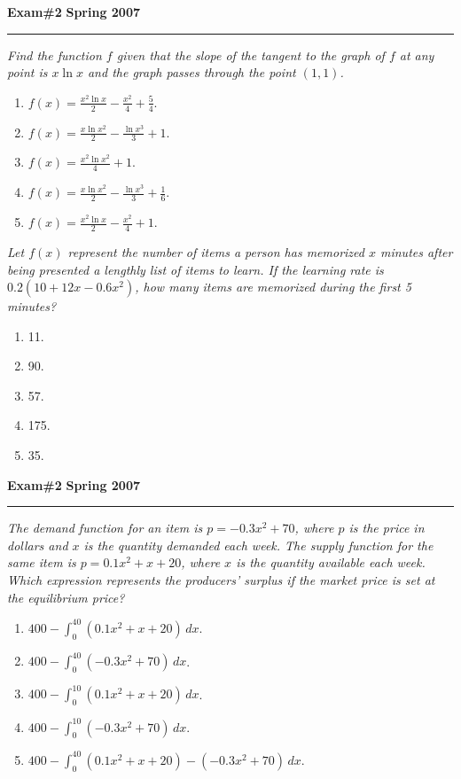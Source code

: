 \documentclass[12pt]{article}
\begin{document}
\hfill{\large\bf Exam\#2}\hfill{\large\bf
  Spring 2007}\hrule
\bigskip

{\problem \em Find the function $f$ given that the slope of the
  tangent to the graph of $f$ at any point is $x\ln x$ and the graph
  passes through the point $(1,1)$.}
\begin{enumerate}
\item $\displaystyle{f(x) = \frac{x^2\ln x}{2} - \frac{x^2}{4} +
    \frac{5}{4}}$.
\item $\displaystyle{f(x) = \frac{x\ln x^2}{2} - \frac{\ln x^3}{3} +
    1}$.
\item $\displaystyle{f(x) = \frac{x^2\ln x^2}{4} + 1}$.
\item $\displaystyle{f(x) = \frac{x\ln x^2}{2} - \frac{\ln x^3}{3} +
    \frac{1}{6}}$.
\item $\displaystyle{f(x) = \frac{x^2\ln x}{2} - \frac{x^2}{4} + 1}$.
\end{enumerate}
\vspace{4cm}

{\problem \em Let $f(x)$ represent the number of items a person has
  memorized $x$ minutes after being presented a lengthly list of
  items to learn.  If the learning rate is $0.2 (10 + 12x - 0.6x^2)$,
  how many items are memorized during the first 5 minutes?}
\begin{enumerate}
\item 11.
\item 90.
\item 57.
\item 175.
\item 35.
\end{enumerate}
\newpage

\hfill{\large\bf Exam\#2}\hfill{\large\bf
  Spring 2007}\hrule
\bigskip

{\problem \em The demand function for an item is $p = -0.3x^2+70$,
  where $p$ is the price in dollars and $x$ is the quantity demanded
  each week.  The supply function for the same item is $p =0.1 x^2
  +x+20$, where $x$ is the quantity available each week.  Which
  expression represents the producers' surplus if the market price is
  set at the equilibrium price?}
\begin{enumerate}
\item $\displaystyle{400 - \int_0^{40} (0.1x^2+x+20)\, dx}$.
\item $\displaystyle{400 - \int_0^{40} (-0.3x^2+70)\, dx}$.
\item $\displaystyle{400 - \int_0^{10} (0.1x^2+x+20)\, dx}$.
\item $\displaystyle{400 - \int_0^{10} (-0.3x^2+70)\, dx}$.
\item $\displaystyle{400 - \int_0^{40} (0.1x^2+x+20) - (-0.3x^2 + 70)\, dx}$.
\end{enumerate}
\end{document}
